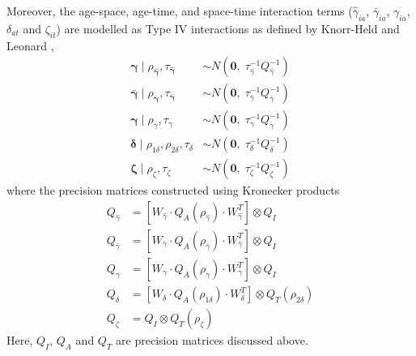 \documentclass{article}
\begin{document}
\begin{appendix}
\noindent Moreover, the age-space, age-time, and space-time interaction terms ($\hat{\gamma}_{ia}$, $\bar{\gamma}_{ia}$, $\gamma_{ia}$, $\delta_{at}$ and $\zeta_{it}$) are modelled as Type IV interactions as defined by Knorr-Held and Leonard \cite{knorr2000bayesian},
\begin{align*} 
  \hat{\boldsymbol{\gamma}} \; | \; \rho_{\boldsymbol{\hat{\gamma}}}, \tau_{\boldsymbol{\hat{\gamma}}} &\sim N(\boldsymbol{0}, \;\tau^{-1}_{\hat{\gamma}} Q^{-1}_{\hat{\gamma}}) \\
  \bar{\boldsymbol{\gamma}} \; | \; \rho_{\boldsymbol{\bar{\gamma}}}, \tau_{\boldsymbol{\bar{\gamma}}} &\sim N(\boldsymbol{0}, \;\tau^{-1}_{\bar{\gamma}} Q^{-1}_{\bar{\gamma}}) \\
  \boldsymbol{\gamma} \; | \; \rho_{\gamma}, \tau_{\gamma} &\sim N(\boldsymbol{0}, \;\tau^{-1}_{\gamma} Q^{-1}_{\gamma})\\
  \boldsymbol{\delta} \; | \; \rho_{1\delta}, \rho_{2\delta}, \tau_{\delta} &\sim N(\boldsymbol{0}, \;\tau^{-1}_{\delta} Q^{-1}_{\delta})\\
  \boldsymbol{\zeta} \; | \; \rho_{\zeta}, \tau_{\zeta} &\sim N(\boldsymbol{0}, \;\tau^{-1}_{\zeta} Q^{-1}_{\zeta})
\end{align*}
where the precision matrices constructed using Kronecker products 
\begin{align*} 
	Q_{\hat{\gamma}} &= [W_{\hat{\gamma}}\cdot Q_A(\rho_{\hat{\gamma}}) \cdot W^T_{\hat{\gamma}} ]\otimes Q_I\\
	Q_{\bar{\gamma}} &= [W_{\bar{\gamma}}\cdot Q_A(\rho_{\bar{\gamma}}) \cdot W^T_{\bar{\gamma}} ]\otimes Q_I\\
	Q_{\gamma} &= [W_{\gamma}\cdot Q_A(\rho_{\gamma}) \cdot W^T_{\gamma} ]\otimes Q_I\\
	Q_{\delta} &=[W_{\delta}\cdot Q_A(\rho_{1\delta}) \cdot W^T_{\delta} ] \otimes Q_T(\rho_{2\delta})\\
	Q_{\zeta} &=Q_I \otimes Q_T(\rho_{\zeta})
\end{align*}
Here, $Q_I$, $Q_A$ and $Q_T$ are precision matrices discussed above.\\


\end{appendix}
\end{document}
